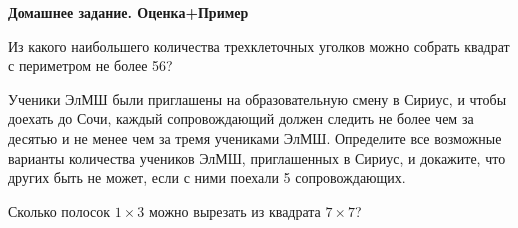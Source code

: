\hspace{3mm}

\centerline{\bf \Huge Домашнее задание. Оценка+Пример}

\hspace{3mm}

 Из какого наибольшего количества трехклеточных уголков можно собрать квадрат с периметром не более 56?

\hspace{3mm}

 Ученики ЭлМШ были приглашены на образовательную смену в Сириус, и чтобы доехать до Сочи, каждый сопровождающий должен следить не более чем за десятью и не менее чем за тремя учениками ЭлМШ. Определите все возможные варианты количества учеников ЭлМШ, приглашенных в Сириус, и докажите, что других быть не может, если с ними поехали 5 сопровождающих. 

\hspace{3mm}

 Сколько полосок $1\times 3$ можно вырезать из квадрата $7\times 7$?